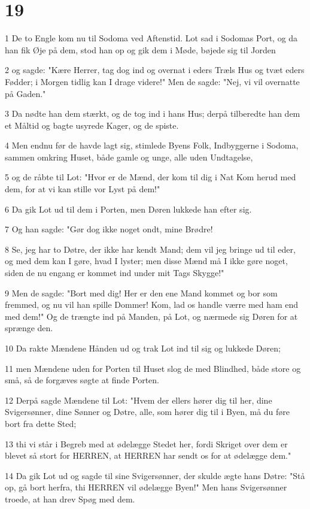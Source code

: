 \chapter{19}

\par 1 De to Engle kom nu til Sodoma ved Aftenstid. Lot sad i Sodomas Port, og da han fik Øje på dem, stod han op og gik dem i Møde, bøjede sig til Jorden
\par 2 og sagde: "Kære Herrer, tag dog ind og overnat i eders Træls Hus og tvæt eders Fødder; i Morgen tidlig kan I drage videre!" Men de sagde: "Nej, vi vil overnatte på Gaden."
\par 3 Da nødte han dem stærkt, og de tog ind i hans Hus; derpå tilberedte han dem et Måltid og bagte usyrede Kager, og de spiste.
\par 4 Men endnu før de havde lagt sig, stimlede Byens Folk, Indbyggerne i Sodoma, sammen omkring Huset, både gamle og unge, alle uden Undtagelse,
\par 5 og de råbte til Lot: "Hvor er de Mænd, der kom til dig i Nat Kom herud med dem, for at vi kan stille vor Lyst på dem!"
\par 6 Da gik Lot ud til dem i Porten, men Døren lukkede han efter sig.
\par 7 Og han sagde: "Gør dog ikke noget ondt, mine Brødre!
\par 8 Se, jeg har to Døtre, der ikke har kendt Mand; dem vil jeg bringe ud til eder, og med dem kan I gøre, hvad I lyster; men disse Mænd må I ikke gøre noget, siden de nu engang er kommet ind under mit Tags Skygge!"
\par 9 Men de sagde: "Bort med dig! Her er den ene Mand kommet og bor som fremmed, og nu vil han spille Dommer! Kom, lad os handle værre med ham end med dem!" Og de trængte ind på Manden, på Lot, og nærmede sig Døren for at sprænge den.
\par 10 Da rakte Mændene Hånden ud og trak Lot ind til sig og lukkede Døren;
\par 11 men Mændene uden for Porten til Huset slog de med Blindhed, både store og små, så de forgæves søgte at finde Porten.
\par 12 Derpå sagde Mændene til Lot: "Hvem der ellers hører dig til her, dine Svigersønner, dine Sønner og Døtre, alle, som hører dig til i Byen, må du føre bort fra dette Sted;
\par 13 thi vi står i Begreb med at ødelægge Stedet her, fordi Skriget over dem er blevet så stort for HERREN, at HERREN har sendt os for at ødelægge dem."
\par 14 Da gik Lot ud og sagde til sine Svigersønner, der skulde ægte hans Døtre: "Stå op, gå bort herfra, thi HERREN vil ødelægge Byen!" Men hans Svigersønner troede, at han drev Spøg med dem.
